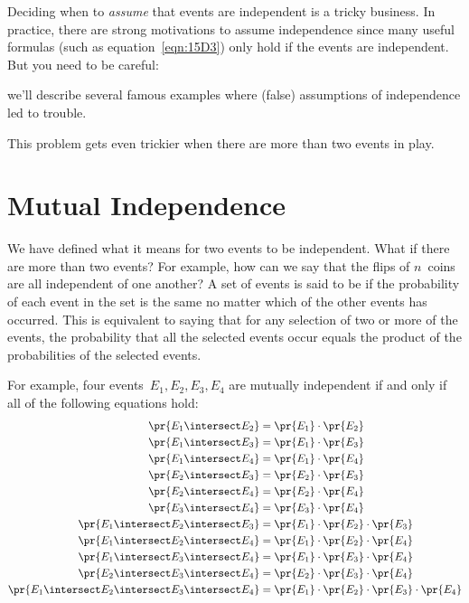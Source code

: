 Deciding when to \emph{assume} that events are independent is a tricky
business.  In practice, there are strong motivations to assume
independence since many useful formulas (such as
equation~\eqref{eqn:15D3}) only hold if the events are independent.
But you need to be careful:
\iffalse
 lest you end up deriving false conclusions.
\fi
we'll describe several famous examples where (false) assumptions of
independence led to trouble.
\iffalse
 over the next several chapters
\fi
This problem gets even trickier when there are more than two events in
play.

\section{Mutual Independence}


We have defined what it means for two events to be independent.  What
if there are more than two events?  For example, how can we say that
the flips of $n$~coins are all independent of one another?  A set of
events is said to be  if the probability of
each event in the set is the same no matter which of the other events
has occurred.  This is equivalent to saying that for any selection of
two or more of the events, the probability that all the selected
events occur equals the product of the probabilities of the selected
events.

For example, four events~$E_1, E_2, E_3, E_4$ are mutually
independent if and only if all of the following equations hold:
%
\begin{align*}
\pr{E_1 \intersect E_2}
    & = \pr{E_1} \cdot \pr{E_2}
\\
\pr{E_1 \intersect E_3}
    & = \pr{E_1} \cdot \pr{E_3}
\\
\pr{E_1 \intersect E_4}
    & = \pr{E_1} \cdot \pr{E_4}
\\
\pr{E_2 \intersect E_3}
    & = \pr{E_2} \cdot \pr{E_3}
\\
\pr{E_2 \intersect E_4}
    & = \pr{E_2} \cdot \pr{E_4}
\\
\pr{E_3 \intersect E_4}
    & = \pr{E_3} \cdot \pr{E_4}
 \\
\pr{E_1 \intersect E_2 \intersect E_3}
    & = \pr{E_1} \cdot \pr{E_2} \cdot \pr{E_3}
\\
\pr{E_1 \intersect E_2 \intersect E_4}
    & = \pr{E_1} \cdot \pr{E_2} \cdot \pr{E_4}
\\
\pr{E_1 \intersect E_3 \intersect E_4}
    & = \pr{E_1} \cdot \pr{E_3} \cdot \pr{E_4}
\\
\pr{E_2 \intersect E_3 \intersect E_4}
    & = \pr{E_2} \cdot \pr{E_3} \cdot \pr{E_4}
 \\
\pr{E_1 \intersect E_2 \intersect E_3 \intersect E_4} & = \pr{E_1} \cdot \pr{E_2} \cdot \pr{E_3} \cdot \pr{E_4}
\end{align*}

